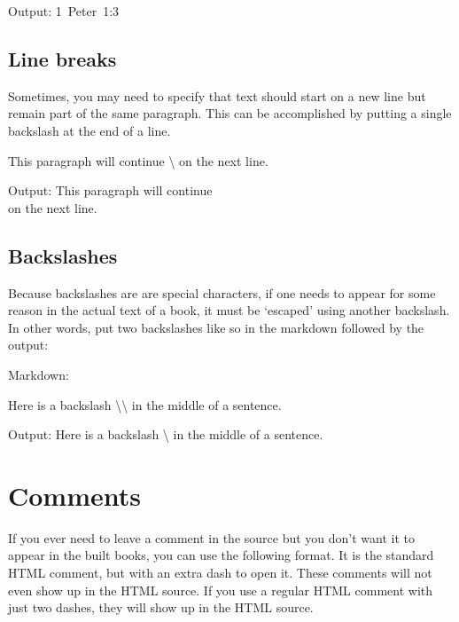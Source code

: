 \documentclass[
]{book}
\newenvironment{Shaded}{\begin{snugshade}}{\end{snugshade}}
\newcommand{\NormalTok}[1]{#1}
\newcommand{\SpecialCharTok}[1]{\textcolor[rgb]{0.00,0.00,0.00}{#1}}
\begin{document}
Output: 1~Peter~1:3

\hypertarget{line-breaks}{%
\section{Line breaks}\label{line-breaks}}

Sometimes, you may need to specify that text should start on a new line but remain part of the same paragraph. This can be accomplished by putting a single backslash at the end of a line.

\begin{Shaded}
\begin{Highlighting}[]
\NormalTok{This paragraph will continue \textbackslash{}}
\NormalTok{on the next line.}
\end{Highlighting}
\end{Shaded}

Output: This paragraph will continue\\
on the next line.

\hypertarget{backslashes}{%
\section{Backslashes}\label{backslashes}}

Because backslashes are are special characters, if one needs to appear for some reason in the actual text of a book, it must be `escaped' using another backslash. In other words, put two backslashes like so in the markdown followed by the output:

Markdown:

\begin{Shaded}
\begin{Highlighting}[]
\NormalTok{Here is a backslash }\SpecialCharTok{\textbackslash{}\textbackslash{}}\NormalTok{ in the middle of a sentence. }
\end{Highlighting}
\end{Shaded}

Output: Here is a backslash \textbackslash{} in the middle of a sentence.

\hypertarget{comments}{%
\chapter{Comments}\label{comments}}

If you ever need to leave a comment in the source but you don't want it to appear in the built books, you can use the following format. It is the standard HTML comment, but with an extra dash to open it. These comments will not even show up in the HTML source. If you use a regular HTML comment with just two dashes, they will show up in the HTML source.
\end{document}
